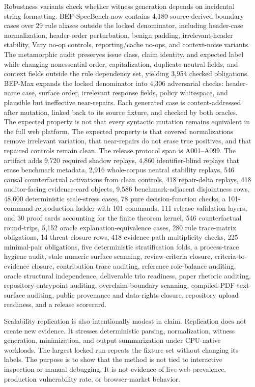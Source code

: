 \documentclass[10pt,conference]{IEEEtran}
\begin{document}
Robustness variants check whether witness generation depends on incidental string formatting. BEP-SpecBench now contains 4,180 source-derived boundary cases over 29 rule aliases outside the locked denominator, including header-case normalization, header-order perturbation, benign padding, irrelevant-header stability, Vary no-op controls, reporting/cache no-ops, and context-noise variants. The metamorphic audit preserves issue class, claim identity, and expected label while changing nonessential order, capitalization, duplicate neutral fields, and context fields outside the rule dependency set, yielding 3,954 checked obligations. BEP-Max expands the locked denominator into 4,306 adversarial checks: header-name case, surface order, irrelevant response fields, policy whitespace, and plausible but ineffective near-repairs. Each generated case is content-addressed after mutation, linked back to its source fixture, and checked by both oracles. The expected property is not that every syntactic mutation remains equivalent in the full web platform. The expected property is that covered normalizations remove irrelevant variation, that near-repairs do not erase true positives, and that repaired controls remain clean. The release protocol span is A001--A099. The artifact adds 9,720 required shadow replays, 4,860 identifier-blind replays that erase benchmark metadata, 2,916 whole-corpus neutral stability replays, 546 causal counterfactual activations from clean controls, 418 repair-delta replays, 418 auditor-facing evidence-card objects, 9,586 benchmark-adjacent disjointness rows, 48,600 deterministic scale-stress cases, 78 pure decision-function checks, a 101-command reproduction ladder with 101 commands, 111 release-validation layers, and 30 proof cards accounting for the finite theorem kernel, 546 counterfactual round-trips, 5,152 oracle explanation-equivalence cases, 280 rule trace-matrix obligations, 14 threat-closure rows, 418 evidence-path multiplicity checks, 225 minimal-pair obligations, five deterministic stratification folds, a process-trace hygiene audit, stale numeric surface scanning, review-criteria closure, criteria-to-evidence closure, contribution trace auditing, reference role-balance auditing, oracle structural independence, deliverable trio readiness, paper rhetoric auditing, repository-entrypoint auditing, overclaim-boundary scanning, compiled-PDF text-surface auditing, public provenance and data-rights closure, repository upload readiness, and a release scorecard.

Scalability replication is also intentionally modest in claim. Replication does not create new evidence. It stresses deterministic parsing, normalization, witness generation, minimization, and output summarization under CPU-native workloads. The largest locked run repeats the fixture set without changing its labels. The purpose is to show that the method is not tied to interactive inspection or manual debugging. It is not evidence of live-web prevalence, production vulnerability rate, or browser-market behavior.
\end{document}
